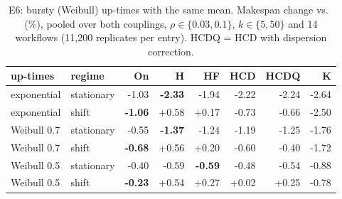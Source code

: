 \begin{table}[t]\centering\scriptsize
\caption{E6: bursty (Weibull) up-times with the same mean. Makespan change vs.\ \EFT{} (\%), pooled over both couplings, $\rho\in\{0.03,0.1\}$, $k\in\{5,50\}$ and 14 workflows (11{,}200 replicates per entry). HCDQ = HCD with dispersion correction.}\label{tab:e6}
\setlength{\tabcolsep}{2.5pt}\begin{tabular}{llrrrrrr}
\toprule
up-times & regime & On & H & HF & HCD & HCDQ & K\\
\midrule
exponential & stationary & -1.03 & \textbf{-2.33} & -1.94 & -2.22 & -2.24 & -2.64\\
exponential & shift & \textbf{-1.06} & +0.58 & +0.17 & -0.73 & -0.66 & -2.50\\
Weibull 0.7 & stationary & -0.55 & \textbf{-1.37} & -1.24 & -1.19 & -1.25 & -1.76\\
Weibull 0.7 & shift & \textbf{-0.68} & +0.56 & +0.20 & -0.60 & -0.40 & -1.72\\
Weibull 0.5 & stationary & -0.40 & -0.59 & \textbf{-0.59} & -0.48 & -0.54 & -0.88\\
Weibull 0.5 & shift & \textbf{-0.23} & +0.54 & +0.27 & +0.02 & +0.25 & -0.78\\
\bottomrule\end{tabular}\end{table}